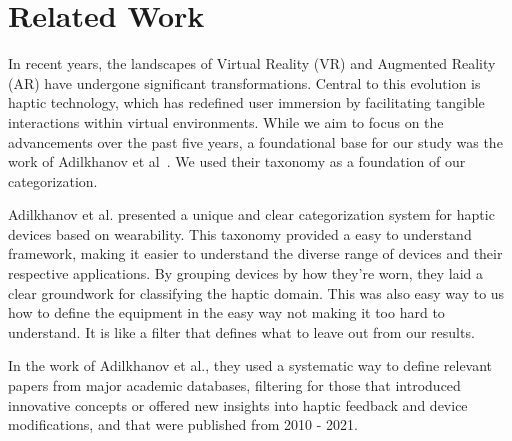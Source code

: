 \section{Related Work}
\label{sec:rel_work}

In recent years, the landscapes of Virtual Reality (VR) and Augmented Reality (AR) have undergone significant transformations. Central to this evolution is haptic technology, which has redefined user immersion by facilitating tangible interactions within virtual environments. While we aim to focus on the advancements over the past five years, a foundational base for our study was the work of Adilkhanov et al~\cite{Adilkhanov22}. We used their taxonomy as a foundation of our categorization.

Adilkhanov et al. presented a unique and clear categorization system for haptic devices based on wearability. This taxonomy provided a easy to understand framework, making it easier to understand the diverse range of devices and their respective applications. By grouping devices by how they're worn, they laid a clear groundwork for classifying the haptic domain. This was also easy way to us how to define the equipment in the easy way not making it too hard to understand. It is like a filter that defines what to leave out from our results.

In the work of Adilkhanov et al., they used a systematic way to define relevant papers from major academic databases, filtering for those that introduced innovative concepts or offered new insights into haptic feedback and device modifications, and that were published from 2010 - 2021.
